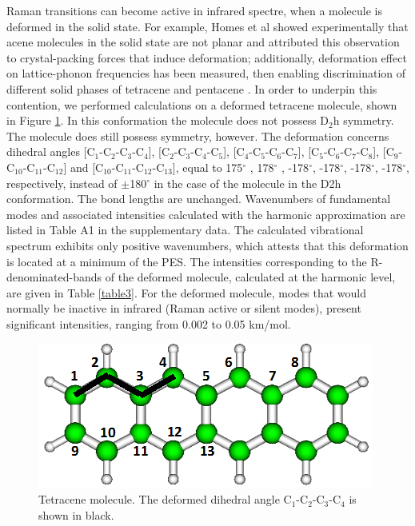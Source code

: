 Raman transitions can become active in infrared spectre, when a molecule is deformed in the solid state. For example, Homes et al\cite{holmes1999nature} showed experimentally that acene molecules in the solid state are not planar and attributed this observation to crystal-packing forces that induce deformation; additionally, deformation effect on lattice-phonon frequencies has been measured, then enabling discrimination of different solid phases of tetracene \cite{venuti2004phonons} and pentacene \cite{venuti2002probing,brillante2002raman}. 
In order to underpin this contention, we performed calculations on a deformed tetracene molecule, shown in Figure \ref{figure3}. In this conformation the molecule does not possess D$_{2}$h symmetry. The molecule does still possess symmetry, however. The deformation concerns dihedral angles [C$_{1}$-C$_{2}$-C$_{3}$-C$_{4}$], [C$_{2}$-C$_{3}$-C$_{4}$-C$_{5}$], [C$_{4}$-C$_{5}$-C$_{6}$-C$_{7}$], [C$_{5}$-C$_{6}$-C$_{7}$-C$_{8}$], [C$_{9}$-C$_{10}$-C$_{11}$-C$_{12}$] and [C$_{10}$-C$_{11}$-C$_{12}$-C$_{13}$], equal to 175$^{\circ}$ , 178$^{\circ}$ , -178$^{\circ}$, -178$^{\circ}$, -178$^{\circ}$, -178$^{\circ}$, respectively, instead of $\pm$180$^{\circ}$ in the case of the molecule in the D2h conformation. The bond lengths are unchanged. Wavenumbers of fundamental modes and associated intensities calculated with the harmonic approximation are listed in Table A1 in the supplementary data. The calculated vibrational spectrum exhibits only positive wavenumbers, which attests that this deformation is located at a minimum of the PES. The intensities corresponding to the R-denominated-bands of the deformed molecule, calculated at the harmonic level, are given in Table \ref{table3}. For the deformed molecule, modes that would normally be inactive in infrared (Raman active or silent modes), present significant intensities, ranging from 0.002 to 0.05 km/mol.

\begin{figure}[h]
	\centering
	\includegraphics[scale=0.6]{image/Tetracene-def}
	\caption[The deformed dihedral angle C$_{1}$-C$_{2}$-C$_{3}$-C$_{4}$ in Tetracene molecule]{Tetracene molecule. The deformed dihedral angle C$_{1}$-C$_{2}$-C$_{3}$-C$_{4}$ is shown in black.} \label{figure3}
\end{figure}

